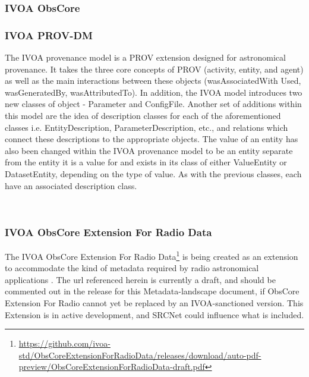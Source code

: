 \subsubsection{IVOA ObsCore}
    
\subsubsection{IVOA PROV-DM}

The IVOA provenance model is a PROV extension designed for astronomical provenance.
It takes the three core concepts of PROV (activity, entity, and agent) as well as the main interactions between these objects (wasAssociatedWith Used, wasGeneratedBy, wasAttributedTo).
In addition, the IVOA model introduces two new classes of object - Parameter and ConfigFile. 
Another set of additions within this model are the idea of description classes for each of the aforementioned classes i.e. EntityDescription, ParameterDescription, etc., and relations which connect these descriptions to the appropriate objects.
The value of an entity has also been changed within the IVOA provenance model to be an entity separate from the entity it is a value for and exists in its class of either ValueEntity or DatasetEntity, depending on the type of value.
As with the previous classes, each have an associated description class. 


\\
    \subsubsection{IVOA ObsCore Extension For Radio Data}
    
The IVOA ObsCore Extension For Radio Data\footnote{\url{https://github.com/ivoa-std/ObsCoreExtensionForRadioData/releases/download/auto-pdf-preview/ObsCoreExtensionForRadioData-draft.pdf}} is being created as an extension to accommodate the kind of metadata required by radio astronomical applications .  The url referenced herein is currently a draft, and should be commented out in the release for this Metadata-landscape document, if ObsCore Extension For Radio cannot yet be replaced by an IVOA-sanctioned version.  This Extension is in active development, and SRCNet could influence what is included.
    \\

